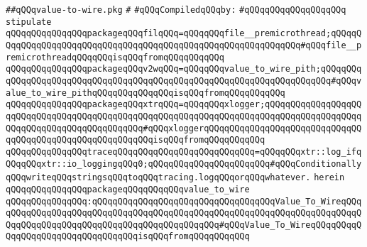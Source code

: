 \label{src/lib/x-kit/xclient/src/wire/value-to-wire.pkg}
\verb|##qQQqvalue-to-wire.pkg|\newline
\verb|#|\newline
\newline
\verb|#qQQqCompiledqQQqby:|\newline
\verb|#qQQqqQQqqQQqqQQqqQQq|\newline
\newline
\newline
\verb|stipulate|\newline
\verb|qQQqqQQqqQQqqQQqpackageqQQqfilqQQq=qQQqqQQqfile__premicrothread;qQQqqQQqqQQqqQQqqQQqqQQqqQQqqQQqqQQqqQQqqQQqqQQqqQQqqQQqqQQqqQQq#qQQqfile__premicrothreadqQQqqQQqisqQQqfromqQQqqQQqqQQq|\newline
\verb|qQQqqQQqqQQqqQQqpackageqQQqv2wqQQq=qQQqqQQqvalue_to_wire_pith;qQQqqQQqqQQqqQQqqQQqqQQqqQQqqQQqqQQqqQQqqQQqqQQqqQQqqQQqqQQqqQQqqQQqqQQq#qQQqvalue_to_wire_pithqQQqqQQqqQQqqQQqisqQQqfromqQQqqQQqqQQq|\newline
\verb|qQQqqQQqqQQqqQQqpackageqQQqxtrqQQq=qQQqqQQqxlogger;qQQqqQQqqQQqqQQqqQQqqQQqqQQqqQQqqQQqqQQqqQQqqQQqqQQqqQQqqQQqqQQqqQQqqQQqqQQqqQQqqQQqqQQqqQQqqQQqqQQqqQQqqQQqqQQqqQQq#qQQqxloggerqQQqqQQqqQQqqQQqqQQqqQQqqQQqqQQqqQQqqQQqqQQqqQQqqQQqqQQqqQQqisqQQqfromqQQqqQQqqQQq|\newline
\verb|qQQqqQQqqQQqqQQqtraceqQQqqQQqqQQqqQQqqQQqqQQqqQQq=qQQqqQQqxtr::log_ifqQQqqQQqxtr::io_loggingqQQq0;qQQqqQQqqQQqqQQqqQQqqQQq#qQQqConditionallyqQQqwriteqQQqstringsqQQqtoqQQqtracing.logqQQqorqQQqwhatever.|\newline
\verb|herein|\newline
\newline
\newline
\verb|qQQqqQQqqQQqqQQqpackageqQQqqQQqqQQqvalue_to_wire|\newline
\verb|qQQqqQQqqQQqqQQq:qQQqqQQqqQQqqQQqqQQqqQQqqQQqqQQqqQQqValue_To_WireqQQqqQQqqQQqqQQqqQQqqQQqqQQqqQQqqQQqqQQqqQQqqQQqqQQqqQQqqQQqqQQqqQQqqQQqqQQqqQQqqQQqqQQqqQQqqQQqqQQqqQQqqQQqqQQqqQQq#qQQqValue_To_WireqQQqqQQqqQQqqQQqqQQqqQQqqQQqqQQqqQQqisqQQqfromqQQqqQQqqQQq|\newline
